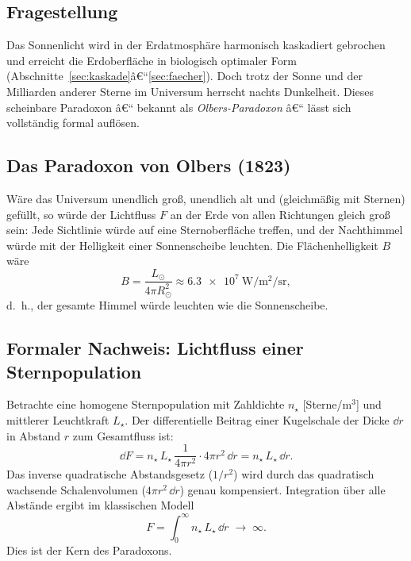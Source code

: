 ﻿\documentclass[12pt,a4paper]{article}
\begin{document}
\subsection{Fragestellung}

Das Sonnenlicht wird in der Erdatmosphäre harmonisch kaskadiert
gebrochen und erreicht die Erdoberfläche in biologisch optimaler
Form (Abschnitte~\ref{sec:kaskade}â€“\ref{sec:faecher}).
Doch trotz der Sonne und der Milliarden anderer Sterne
im Universum herrscht nachts Dunkelheit.
Dieses scheinbare Paradoxon â€“ bekannt als \emph{Olbers-Paradoxon}
\citep{Harrison1987} â€“ lässt sich vollständig formal auflösen.

\subsection{Das Paradoxon von Olbers (1823)}

Wäre das Universum unendlich groß, unendlich alt und
(gleichmäßig mit Sternen) gefüllt, so würde der Lichtfluss $F$
an der Erde von allen Richtungen gleich groß sein:
Jede Sichtlinie würde auf eine Sternoberfläche treffen,
und der Nachthimmel würde mit der Helligkeit einer Sonnenscheibe
leuchten.
Die Flächenhelligkeit $B$ wäre
\begin{equation}
  B = \frac{L_\odot}{4\pi R_\odot^2} \approx \SI{6.3e7}{\watt\per\square\metre\per\steradian},
  \label{eq:B_olbers}
\end{equation}
d.\ h., der gesamte Himmel würde leuchten wie die Sonnenscheibe.

\subsection{Formaler Nachweis: Lichtfluss einer Sternpopulation}

Betrachte eine homogene Sternpopulation mit Zahldichte
$n_\star$ [Sterne/m$^3$] und mittlerer Leuchtkraft $L_\star$.
Der differentielle Beitrag einer Kugelschale der Dicke $\dd r$
in Abstand $r$ zum Gesamtfluss ist:
\begin{equation}
  \dd F = n_\star\,L_\star\,\frac{1}{4\pi r^2}\cdot 4\pi r^2\,\dd r
        = n_\star\,L_\star\,\dd r.
  \label{eq:dF_schale}
\end{equation}
Das inverse quadratische Abstandsgesetz ($1/r^2$) wird durch das
quadratisch wachsende Schalenvolumen ($4\pi r^2\,\dd r$) genau
kompensiert.
Integration über alle Abstände ergibt im klassischen Modell
\begin{equation}
  F = \int_0^\infty n_\star\,L_\star\,\dd r \;\longrightarrow\; \infty.
  \label{eq:F_divergent}
\end{equation}
Dies ist der Kern des Paradoxons.
\end{document}
